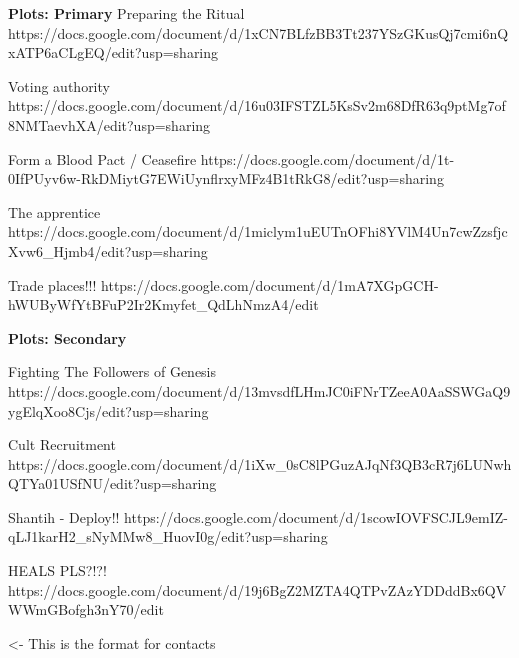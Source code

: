 \documentclass[char]{GL2020}
\begin{document}
\textbf{Plots: Primary}
Preparing the Ritual
https://docs.google.com/document/d/1xCN7BLfzBB3Tt237YSzGKusQj7cmi6nQxATP6aCLgEQ/edit?usp=sharing

Voting authority
https://docs.google.com/document/d/16u03IFSTZL5KsSv2m68DfR63q9ptMg7of8NMTaevhXA/edit?usp=sharing

Form a Blood Pact / Ceasefire
https://docs.google.com/document/d/1t-0IfPUyv6w-RkDMiytG7EWiUynflrxyMFz4B1tRkG8/edit?usp=sharing

The apprentice
https://docs.google.com/document/d/1miclym1uEUTnOFhi8YVlM4Un7cwZzsfjcXvw6_Hjmb4/edit?usp=sharing

Trade places!!!
https://docs.google.com/document/d/1mA7XGpGCH-hWUByWfYtBFuP2Ir2Kmyfet_QdLhNmzA4/edit


\textbf{Plots: Secondary}

Fighting The Followers of Genesis
https://docs.google.com/document/d/13mvsdfLHmJC0iFNrTZeeA0AaSSWGaQ9ygElqXoo8Cjs/edit?usp=sharing

Cult Recruitment
https://docs.google.com/document/d/1iXw_0sC8lPGuzAJqNf3QB3cR7j6LUNwhQTYa01USfNU/edit?usp=sharing

Shantih - Deploy!!
https://docs.google.com/document/d/1scowIOVFSCJL9emIZ-qLJ1karH2_sNyMMw8_HuovI0g/edit?usp=sharing

HEALS PLS?!?!
https://docs.google.com/document/d/19j6BgZ2MZTA4QTPvZAzYDDddBx6QVWWmGBofgh3nY70/edit


\begin{itemz}[Goals]
	\item 
\end{itemz}

\begin{itemz}[Notes]
	\item 
\end{itemz}

\begin{contacts}
	\contact{\cTest{}} <- This is the format for contacts 
\end{contacts}
\end{document}
